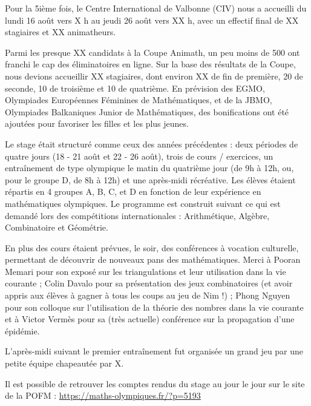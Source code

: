 
Pour la 5ième fois, le Centre International de Valbonne (CIV) nous a accueilli du lundi 16 août vers X h au jeudi 26 août vers XX h, avec un effectif final de XX stagiaires et XX animatheurs. 

Parmi les presque XX candidats à la Coupe Animath, un peu moins de 500 ont franchi le cap des éliminatoires en ligne. Sur la base des résultats de la Coupe, nous devions accueillir XX stagiaires, dont environ XX de fin de première, 20 de seconde, 10 de troisième et 10 de quatrième. En prévision des EGMO, Olympiades Européennes Féminines de Mathématiques,
et de la JBMO, Olympiades Balkaniques Junior de Mathématiques, 
des bonifications ont été ajoutées pour favoriser les filles et les plus jeunes.




Le stage était structuré comme ceux des années précédentes : deux périodes de quatre jours (18 - 21 août et 22 - 26 août), trois de cours / exercices, un entraînement %
de type olympique le matin du quatrième jour (de 9h à 12h, ou, pour le groupe D, de 8h à 12h) et une après-midi récréative. Les élèves étaient répartis en 4 groupes A, B, C, et D en fonction de leur expérience en mathématiques olympiques.
Le programme est construit suivant ce qui est demandé lors des compétitions internationales : Arithmétique, Algèbre, Combinatoire et Géométrie.



En plus des cours étaient prévues, le soir, des conférences à vocation culturelle, permettant de découvrir de nouveaux pans des mathématiques. Merci à Pooran Memari pour son exposé sur les triangulations et leur utilisation dans la vie courante ; Colin Davalo pour sa présentation des jeux combinatoires (et avoir appris aux élèves à gagner à tous les coups au jeu de Nim !) ; Phong Nguyen pour son colloque sur l'utilisation de la théorie des nombres dans la vie courante et à  Victor Vermès pour sa (très actuelle) conférence sur la propagation d'une épidémie.



L'après-midi suivant le premier entraînement fut organisée un grand jeu par une petite équipe chapeautée par X. %


Il est possible de retrouver les comptes rendus du stage au jour le jour sur le site de la POFM : \url{https://maths-olympiques.fr/?p=5193}

\vfill
\pagebreak
